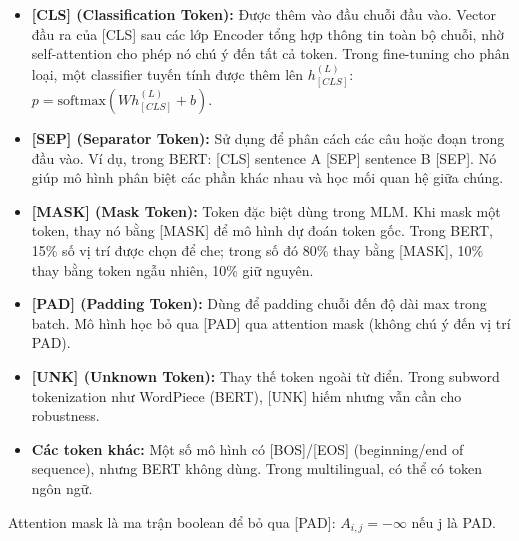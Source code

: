 \begin{itemize}
	\item \textbf{[CLS] (Classification Token):} Được thêm vào đầu chuỗi đầu vào. Vector đầu ra của [CLS] sau các lớp Encoder tổng hợp thông tin toàn bộ chuỗi, nhờ self-attention cho phép nó chú ý đến tất cả token. Trong fine-tuning cho phân loại, một classifier tuyến tính được thêm lên $h_{[CLS]}^{(L)}$: $p = \text{softmax}(W h_{[CLS]}^{(L)} + b)$.
	\item \textbf{[SEP] (Separator Token):} Sử dụng để phân cách các câu hoặc đoạn trong đầu vào. Ví dụ, trong BERT: [CLS] sentence A [SEP] sentence B [SEP]. Nó giúp mô hình phân biệt các phần khác nhau và học mối quan hệ giữa chúng.
	\item \textbf{[MASK] (Mask Token):} Token đặc biệt dùng trong MLM. Khi mask một token, thay nó bằng [MASK] để mô hình dự đoán token gốc. Trong BERT, 15\% số vị trí được chọn để che; trong số đó 80\% thay bằng [MASK], 10\% thay bằng token ngẫu nhiên, 10\% giữ nguyên.
	\item \textbf{[PAD] (Padding Token):} Dùng để padding chuỗi đến độ dài max trong batch. Mô hình học bỏ qua [PAD] qua attention mask (không chú ý đến vị trí PAD).
	\item \textbf{[UNK] (Unknown Token):} Thay thế token ngoài từ điển. Trong subword tokenization như WordPiece (BERT), [UNK] hiếm nhưng vẫn cần cho robustness.
	\item \textbf{Các token khác:} Một số mô hình có [BOS]/[EOS] (beginning/end of sequence), nhưng BERT không dùng. Trong multilingual, có thể có token ngôn ngữ.
\end{itemize}

Attention mask là ma trận boolean để bỏ qua [PAD]: $A_{i,j} = -\infty$ nếu j là PAD.


\begin{center}
	\label{fig:bert_mlm_nsp}
\end{center}
